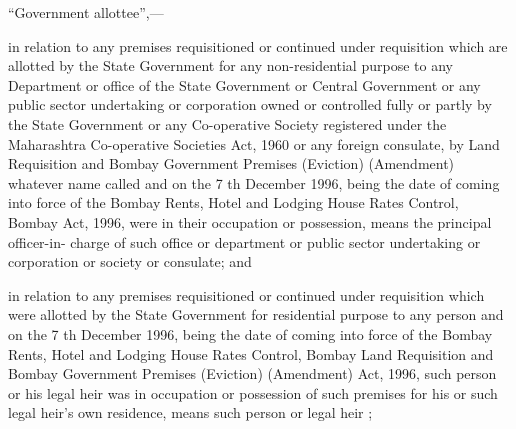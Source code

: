 \documentclass{mhact}
\begin{document}
\begin{subsectionlist}
\item ``Government allottee'',--- \label{it:galot}
  \begin{clause}
    \item in relation to any premises requisitioned or continued under
    requisition which are allotted by the State Government for any
    non-residential purpose to any Department or office of the State
    Government or Central Government or any public sector undertaking
    or corporation owned or controlled fully or partly by the State
    Government or any Co-operative Society registered under the
    Maharashtra Co-operative Societies Act, 1960  or any foreign consulate, by Land Requisition and Bombay
    Government Premises (Eviction) (Amendment) whatever name called
    and on the 7 th December 1996, being the date of coming into force
    of the Bombay Rents, Hotel and Lodging House Rates Control, Bombay
    Act, 1996, were in their occupation or possession, means the
    principal officer-in- charge of such office or department or
    public sector undertaking or corporation or society or consulate;
    and
    \label{it:galota}
  \item in relation to any premises requisitioned or continued under
    requisition which were allotted by the State Government for
    residential purpose to any person and on the 7 th December 1996,
    being the date of coming into force of the Bombay Rents, Hotel and
    Lodging House Rates Control, Bombay Land Requisition and Bombay
    Government Premises (Eviction) (Amendment) Act, 1996,
     such person or his legal heir was in
    occupation or possession of such premises for his or such legal
    heir's own residence, means such person or legal heir ;
  \end{clause}
  

\end{subsectionlist}
\end{document}
